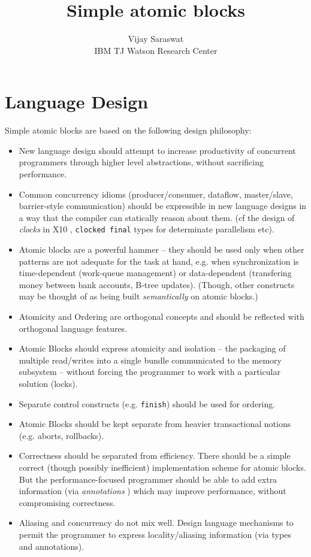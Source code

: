 \documentclass[twocolumn]{article}
\def\Xten{{\sf X10}}
\begin{document}
\title{Simple atomic blocks}
\author{Vijay Saraswat \\ 
IBM TJ Watson Research Center}

\maketitle



\section{Language Design}
Simple atomic blocks are based on the following design philosophy:
\begin{itemize}
  \item New language design should attempt to increase
     productivity of concurrent programmers through higher level
     abstractions, without sacrificing performance.
  \item Common concurrency idioms (producer/consumer, dataflow,
     master/slave, barrier-style communication) should be expressible
     in new language designs in a way that the compiler can statically
     reason about them. (cf{} the design of {\em clocks} in \Xten{}
     \cite{concur05}, {\tt clocked final} types for determinate
     parallelism etc).
  \item Atomic blocks are a powerful hammer -- they should be used
     only when other patterns are not adequate for the task at hand,
     e.g.{} when synchronization is time-dependent (work-queue
     management) or data-dependent (transfering money between bank
     accounts, B-tree updates). (Though, other constructs may be
     thought of as being built {\em semantically} on atomic blocks.)

 \item Atomicity and Ordering are orthogonal concepts and should be reflected with orthogonal language features.
  \item Atomic Blocks should express atomicity and isolation -- the
     packaging of multiple read/writes into a single bundle
     communicated to the memory subsystem -- without forcing the
     programmer to work with a particular solution (locks).
  \item Separate control constructs (e.g. {\tt finish}) should be used
  for ordering.
  \item Atomic Blocks should be kept separate from heavier transactional notions  (e.g. aborts, rollbacks). 
  \item Correctness should be separated from efficiency. There should
  be a simple correct (though possibly inefficient) implementation
  scheme for atomic blocks.  But the performance-focused programmer
  should be able to add extra information (via {\em annotations}
  \cite{x10-annotations}) which may improve performance, without
  compromising correctness.
  \item Aliasing and concurrency do not mix well. Design language
     mechanisms to permit the programmer to express locality/aliasing
     information (via types and annotations). 
\end{itemize}
\end{document}
